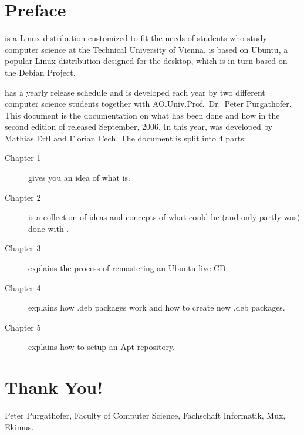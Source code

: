 
\maketitle

\chapter{Preface}
\tunix is a Linux distribution customized to fit the needs of students who study
computer science at the Technical University of Vienna. \tunix is based on
Ubuntu, a popular Linux distribution designed for the desktop, which is in turn
based on the Debian Project.

\tunix has a yearly release schedule and is developed each year by two different 
computer science students together with AO.Univ.Prof.\ Dr.\ Peter Purgathofer. 
This document is the documentation on what has been done and how in the second
edition of \tunix released September, 2006. In this year, \tunix was developed
by Mathias Ertl and Florian Cech. The document is split into 4 parts:
\begin{description}
\item[Chapter 1] gives you an idea of what \tunix is.
\item[Chapter 2] is a collection of ideas and concepts of what could be (and only
partly was) done with \tunix.
\item[Chapter 3] explains the process of remastering an Ubuntu live-CD.
\item[Chapter 4] explains how .deb packages work and how to create new .deb
packages.
\item[Chapter 5] explains how to setup an Apt-repository.
\end{description}

\chapter{Thank You!}
Peter Purgathofer, Faculty of Computer Science, Fachschaft Informatik, Mux,
Ekimus.

\tableofcontents
\lstlistoflistings
